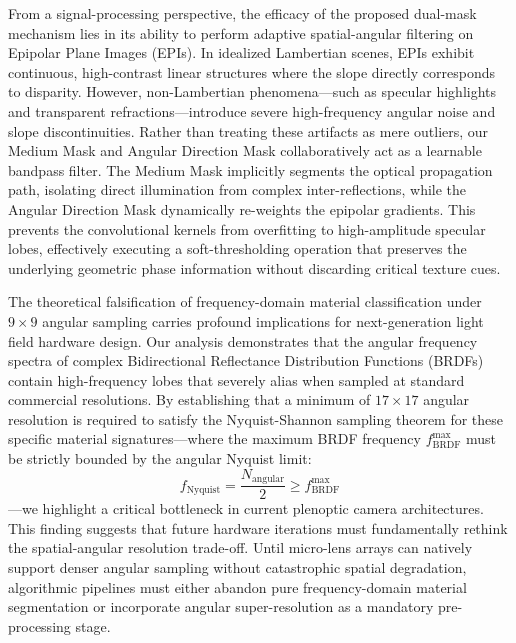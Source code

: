 From a signal-processing perspective, the efficacy of the proposed dual-mask mechanism lies in its ability to perform adaptive spatial-angular filtering on Epipolar Plane Images (EPIs). In idealized Lambertian scenes, EPIs exhibit continuous, high-contrast linear structures where the slope directly corresponds to disparity. However, non-Lambertian phenomena—such as specular highlights and transparent refractions—introduce severe high-frequency angular noise and slope discontinuities. Rather than treating these artifacts as mere outliers, our Medium Mask and Angular Direction Mask collaboratively act as a learnable bandpass filter. The Medium Mask implicitly segments the optical propagation path, isolating direct illumination from complex inter-reflections, while the Angular Direction Mask dynamically re-weights the epipolar gradients. This prevents the convolutional kernels from overfitting to high-amplitude specular lobes, effectively executing a soft-thresholding operation that preserves the underlying geometric phase information without discarding critical texture cues.

The theoretical falsification of frequency-domain material classification under $9 \times 9$ angular sampling carries profound implications for next-generation light field hardware design. Our analysis demonstrates that the angular frequency spectra of complex Bidirectional Reflectance Distribution Functions (BRDFs) contain high-frequency lobes that severely alias when sampled at standard commercial resolutions. By establishing that a minimum of $17 \times 17$ angular resolution is required to satisfy the Nyquist-Shannon sampling theorem for these specific material signatures—where the maximum BRDF frequency $f_{\text{BRDF}}^{\text{max}}$ must be strictly bounded by the angular Nyquist limit:
\begin{equation}
\label{eq:eq30}
f_{\text{Nyquist}} = \frac{N_{\text{angular}}}{2} \geq f_{\text{BRDF}}^{\text{max}}
\end{equation}
—we highlight a critical bottleneck in current plenoptic camera architectures. This finding suggests that future hardware iterations must fundamentally rethink the spatial-angular resolution trade-off. Until micro-lens arrays can natively support denser angular sampling without catastrophic spatial degradation, algorithmic pipelines must either abandon pure frequency-domain material segmentation or incorporate angular super-resolution as a mandatory pre-processing stage.

